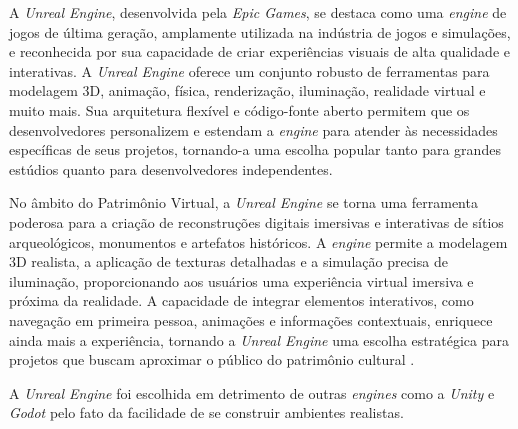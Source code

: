 A \textit{Unreal Engine}, desenvolvida pela \textit{Epic Games}, se destaca como uma \textit{engine} de jogos de última geração, amplamente utilizada na indústria de jogos e simulações, e reconhecida por sua capacidade de criar experiências visuais de alta qualidade e interativas.  A \textit{Unreal Engine} oferece um conjunto robusto de ferramentas para modelagem 3D, animação, física, renderização, iluminação, realidade virtual e muito mais. Sua arquitetura flexível e código-fonte aberto permitem que os desenvolvedores personalizem e estendam a \textit{engine} para atender às necessidades específicas de seus projetos, tornando-a uma escolha popular tanto para grandes estúdios quanto para desenvolvedores independentes.

No âmbito do Patrimônio Virtual, a \textit{Unreal Engine} se torna uma ferramenta poderosa para a criação de reconstruções digitais imersivas e interativas de sítios arqueológicos, monumentos e artefatos históricos. A \textit{engine} permite a modelagem 3D realista, a aplicação de texturas detalhadas e a simulação precisa de iluminação, proporcionando aos usuários uma experiência virtual imersiva e próxima da realidade. A capacidade de integrar elementos interativos, como navegação em primeira pessoa, animações e informações contextuais, enriquece ainda mais a experiência, tornando a \textit{Unreal Engine} uma escolha estratégica para projetos que buscam aproximar o público do patrimônio cultural \citep{silva2022realidade}. 

A \textit{Unreal Engine} foi escolhida em detrimento de outras \textit{engines} como a \textit{Unity} e \textit{Godot} pelo fato da facilidade de se construir ambientes realistas.

